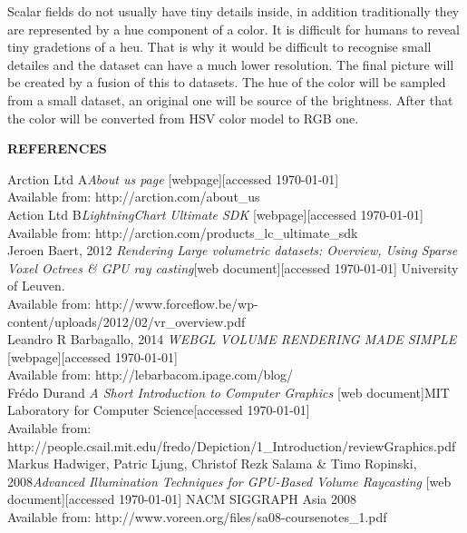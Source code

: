 \documentclass[twoside, english, 11pt]{report}
\begin{document}
Scalar fields do not usually have tiny details inside, in addition traditionally they are represented by a hue component of a color. It is difficult for humans to reveal tiny gradetions of a heu. That is why it would be difficult to recognise small detailes and the dataset can have a much lower resolution. The final picture will be created by a fusion of this to datasets. The hue of the color will be sampled from a small dataset, an original one will be source of the brightness. After that the color will be converted from HSV color model to RGB one.


\newpage

\LARGE \textbf{REFERENCES}\\

\small Arction Ltd A\textit{About us page} [webpage][accessed \today] \\
Available from: http://arction.com/about\_us\\

\small Action Ltd B\textit{LightningChart Ultimate SDK} [webpage][accessed \today] \\
Available from: http://arction.com/products\_lc\_ultimate\_sdk\\

\small Jeroen Baert, 2012 \textit{Rendering Large volumetric datasets: Overview, Using Sparse Voxel Octrees \& GPU ray casting}[web document][accessed \today] University of Leuven.\\
Available from: http://www.forceflow.be/wp-content/uploads/2012/02/vr\_overview.pdf\\

\small Leandro R Barbagallo, 2014 \textit{WEBGL VOLUME RENDERING MADE SIMPLE} [webpage][accessed \today]\\ 
Available from: http://lebarbacom.ipage.com/blog/\\

\small Frédo Durand \textit{A Short Introduction to Computer Graphics} [web document]MIT Laboratory for Computer Science[accessed \today] \\
Available from: http://people.csail.mit.edu/fredo/Depiction/1\_Introduction/reviewGraphics.pdf\\

\small Markus Hadwiger, Patric Ljung, Christof Rezk Salama \& Timo Ropinski, 2008\textit{Advanced Illumination Techniques for GPU-Based Volume Raycasting} [web document][accessed \today] NACM SIGGRAPH Asia 2008 \\
Available from: http://www.voreen.org/files/sa08-coursenotes\_1.pdf\\
\end{document}
